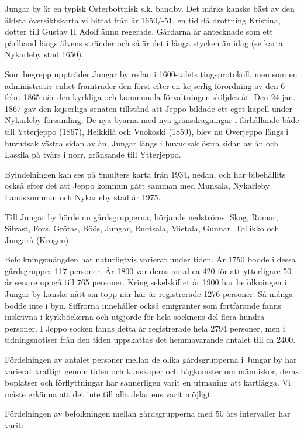 Jungar by är en typisk Österbottnisk s.k. bandby. Det märks kanske bäst av den äldsta översiktskarta vi hittat från år 1650/-51, en tid då drottning Kristina, dotter till Gustav II Adolf ännu regerade. Gårdarna är antecknade som ett pärlband längs älvens stränder och så är det i långa stycken än idag (se karta Nykarleby stad 1650).

Som begrepp uppträder Jungar by redan i 1600-talets tingsprotokoll, men som en administrativ enhet framträder den först efter en kejserlig förordning av den 6 febr. 1865 när den kyrkliga och kommunala förvaltningen skiljdes åt. Den 24 jan. 1867 gav den kejserliga senaten tillstånd att Jeppo bildade ett eget kapell under Nykarleby församling. De nya byarna med nya gränsdragningar i förhållande både till Ytterjeppo (1867), Heikkilä och Vuokoski (1859), blev nu Överjeppo längs i huvudsak västra sidan av ån, Jungar längs i huvudsak östra sidan av ån och Lassila på tvärs i norr, gränsande till Ytterjeppo.

Byindelningen kan ses på Smulters karta från 1934, nedan, och har bibehållits också efter det att Jeppo kommun gått samman med Munsala, Nykarleby Landskommun och Nykarleby stad år 1975.

Till Jungar by hörde nu gårdsgrupperna, börjande nedströms: Skog, Romar, Silvast, Fors, Grötas, Böös, Jungar, Ruotsala, Mietala, Gunnar, Tollikko och Jungarå (Krogen).

Befolkningsmängden har naturligtvis varierat under tiden. År 1750 bodde i dessa gårdsgrupper 117 personer. År 1800 var deras antal ca 420 för att ytterligare 50 år senare uppgå till 765 personer. Kring sekelskiftet år 1900 har befolkningen i Jungar by kanske nått sin topp när här är registrerade 1276 personer. Så många bodde inte i byn. Siffrorna innehåller också emigranter som fortfarande fanns inskrivna i kyrkböckerna och utgjorde för hela socknens del flera hundra personer. I Jeppo socken fanns detta år registrerade hela 2794 personer, men i tidningsnotiser från den tiden uppskattas det hemmavarande antalet till ca 2400.

Fördelningen av antalet personer mellan de olika gårdsgrupperna i Jungar by har varierat kraftigt genom tiden och kunskaper och hågkomster om människor, deras boplatser och förflyttningar har sannerligen varit en utmaning att kartlägga. Vi måste erkänna att det inte till alla delar ens varit möjligt.

Fördelningen av befolkningen mellan gårdsgrupperna med 50 års intervaller har varit:

